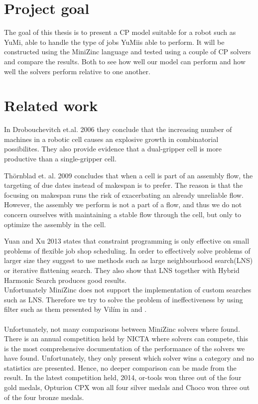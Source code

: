 \section{Project goal}
The goal of this thesis is to present a CP model suitable for a robot such as YuMi\textsuperscript\textregistered, able to handle the type of jobs YuMi\textsuperscript\textregistered is able to perform. It will be constructed using the MiniZinc language and tested using a couple of CP solvers and compare the results. Both to see how well our model can perform and how well the solvers perform relative to one another.

\section{Related work}
In Drobouchevitch et.al. 2006 they conclude that the increasing number of machines in a robotic cell causes an explosive growth in combinatorial possibilites. They also provide evidence that a dual-gripper cell is more productive than a single-gripper cell.\cite{sethi_2006}

Thörnblad et. al. 2009 concludes that when a cell is part of an assembly flow, the targeting of due dates instead of makespan is to prefer. The reason is that the focusing on makespan runs the risk of exacerbating an already unreliable flow.\cite{thornblad_2013} However, the assembly we perform is not a part of a flow, and thus we do not concern ourselves with maintaining a stable flow through the cell, but only to optimize the assembly in the cell.

Yuan and Xu 2013 states that constraint programming is only effective on small problems of flexible job shop scheduling. In order to effectively solve problems of larger size they suggest to use methods such as large neighbourhood search(LNS) or iterative flattening search. They also show that LNS together with Hybrid Harmonic Search produces good results.\cite{yuan_2013}
\\
Unfortunately MiniZinc does not support the implementation of custom searches such as LNS. Therefore we try to solve the problem of ineffectiveness by using filter such as them presented by Vilím in \cite{VilimBartak2002Batch} \cite{Vilim2002Precedence} and \cite{VilimBartak2002Sequence}.
\\\\
Unfortunately, not many comparisons between MiniZinc solvers where found. There is an annual competition held by NICTA where solvers can compete, this is the most comprehensive documentation of the performance of the solvers we have found. Unfortunately, they only present which solver wins a category and no statistics are presented. Hence, no deeper comparison can be made from the result. In the latest competition held, 2014, or-tools won three out of the four gold medals, Opturion CPX won all four silver medals and Choco won three out of the four bronze medals.\cite{mz_result_2014}

